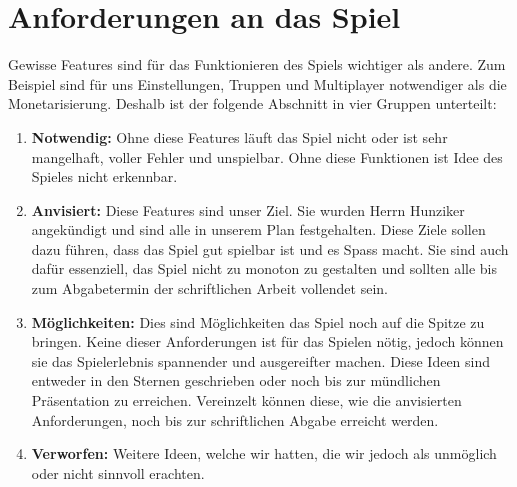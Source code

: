 \section{Anforderungen an das Spiel}
\label{chap:foo}
Gewisse Features sind für das Funktionieren des Spiels wichtiger als andere.
Zum Beispiel sind für uns Einstellungen, Truppen und Multiplayer notwendiger als die Monetarisierung.
Deshalb ist der folgende Abschnitt in vier Gruppen unterteilt:
\begin{enumerate}
    \item \textbf{Notwendig:}
        Ohne diese Features läuft das Spiel nicht oder ist sehr mangelhaft,
        voller Fehler und unspielbar. Ohne diese Funktionen ist Idee des Spieles nicht erkennbar.
    \item \textbf{Anvisiert:}
        Diese Features sind unser Ziel. Sie wurden Herrn Hunziker angekündigt und sind alle in unserem Plan festgehalten.
        Diese Ziele sollen dazu führen, dass das Spiel
        gut spielbar ist und es Spass macht. Sie sind auch dafür essenziell, das Spiel nicht zu monoton zu gestalten und sollten
        alle bis zum Abgabetermin der schriftlichen Arbeit vollendet sein.
    \item \textbf{Möglichkeiten:}
        Dies sind Möglichkeiten das Spiel noch auf die Spitze zu bringen. Keine dieser Anforderungen ist für das Spielen nötig,
        jedoch können sie das Spielerlebnis spannender und ausgereifter machen. Diese
        Ideen sind entweder in den Sternen geschrieben oder noch bis zur mündlichen Präsentation zu erreichen.
        Vereinzelt können diese, wie die anvisierten Anforderungen, noch bis zur schriftlichen Abgabe erreicht werden.
    \item \textbf{Verworfen:}
        Weitere Ideen, welche wir hatten, die wir jedoch als unmöglich oder nicht sinnvoll erachten.
\end{enumerate}

